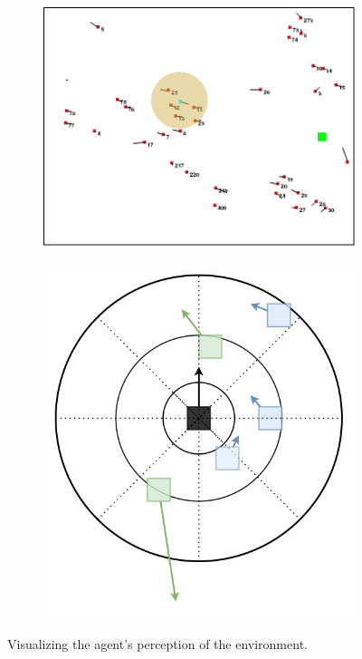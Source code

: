 \begin{figure}
	\label{fig:agent-perspective-risk-features}
	\begin{subfigure}[t]{.5\linewidth}
		\centering
		\includegraphics[width=.95\textwidth]{figures/env_screenshot_agent_perspective.png}
		\label{fig:agent-perspective_env}
		\centering
	\end{subfigure}
	\begin{subfigure}[t]{.5\linewidth}
		\centering
		\includegraphics[width=.7\textwidth]{figures/agent_perspective_recreated.png}
		\label{fig:agent-perspective_agent-perspective}
	\end{subfigure}
	\caption{Visualizing the agent's perception of the environment.}
\end{figure}




